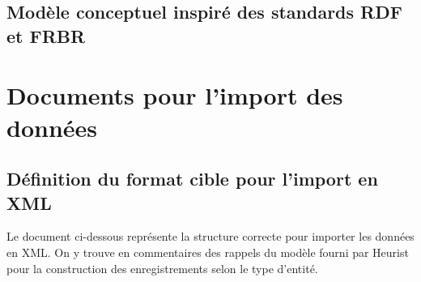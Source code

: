 \documentclass[a4paper,12pt,twoside]{book}
\begin{document}
	\subsection{Modèle conceptuel inspiré des standards RDF et FRBR}
	
	
	
	\section{Documents pour l'import des données}
	
	\subsection{\label{def_cible}Définition du format cible pour l'import en XML}
	
	Le document ci-dessous représente la structure correcte pour importer les données en XML. On y trouve en commentaires des rappels du modèle fourni par Heurist pour la construction des enregistrements selon le type d'entité.
	
\end{document}
